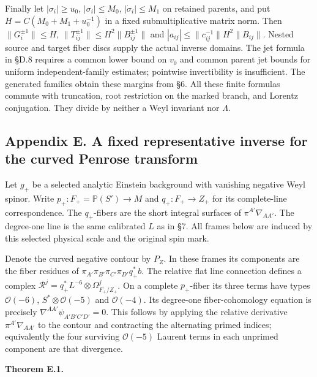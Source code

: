 \documentclass[
  english,
  11pt,
  reqno]{amsart}
\makeatletter
\newcommand{\pandocstatementheading}[1]{%
  \par\addpenalty{\@beginparpenalty}%
  \addvspace{.5\baselineskip plus .2\baselineskip minus .2\baselineskip}%
  {\normalfont\bfseries #1\par}%
  \nobreak\@afterindenttrue\@afterheading
}
\makeatother
\begin{document}
Finally let \(|\sigma_i|\ge u_0\), \(|\sigma_i|\le M_0\),
\(|\dot\sigma_i|\le M_1\) on retained parents, and put
\(H=C(M_0+M_1+u_0^{-1})\) in a fixed submultiplicative matrix norm. Then
\(\|G_i^{\pm1}\|\le H\), \(\|T_{ij}^{\pm1}\|\le H^2\|B_{ij}^{\pm1}\|\)
and \(|a_{ij}|\le\|c_{ij}^{-1}\|H^2\|B_{ij}\|\). Nested source and
target fiber discs supply the actual inverse domains. The jet formula in
§D.8 requires a common lower bound on \(v_0\) and common parent jet
bounds for uniform independent-family estimates; pointwise invertibility
is insufficient. The generated families obtain these margins from §6.
All these finite formulas commute with truncation, root restriction on
the marked branch, and Lorentz conjugation. They divide by neither a
Weyl invariant nor \(\Lambda\).

\protect{}\label{app:gg-curved-penrose}

\subsection{Appendix E. A fixed representative inverse for the curved
Penrose
transform}\label{appendix-e.-a-fixed-representative-inverse-for-the-curved-penrose-transform}

Let \(g_+\) be a selected analytic Einstein background with vanishing
negative Weyl spinor. Write \(p_+:F_+=\mathbb P(S')\to M\) and
\(q_+:F_+\to Z_+\) for its complete-line correspondence. The
\(q_+\)-fibers are the short integral surfaces of
\(\pi^{A'}\nabla_{AA'}\). The degree-one line is the same calibrated
\(L\) as in §7. All frames below are induced by this selected physical
scale and the original spin mark.

Denote the curved negative contour by \(P_Z\). In these frames its
components are the fiber residues of
\(\pi_{A'}\pi_{B'}\pi_{C'}\pi_{D'}q_+^*b\). The relative flat line
connection defines a complex
\(\mathcal R^j=q_+^*L^{-6}\otimes\Omega^j_{F_+/Z_+}\). On a complete
\(p_+\)-fiber its three terms have types \(\mathcal O(-6)\),
\(S^*\otimes\mathcal O(-5)\) and \(\mathcal O(-4)\). Its degree-one
fiber-cohomology equation is precisely
\(\nabla^{AA'}\psi_{A'B'C'D'}=0\). This follows by applying the relative
derivative \(\pi^{A'}\nabla_{AA'}\) to the contour and contracting the
alternating primed indices; equivalently the four surviving
\(\mathcal O(-5)\) Laurent terms in each unprimed component are that
divergence.

\pandocstatementheading{\protect{}\label{thm:gg-fixed-curved-penrose-inverse}Theorem E.1.}
\end{document}
